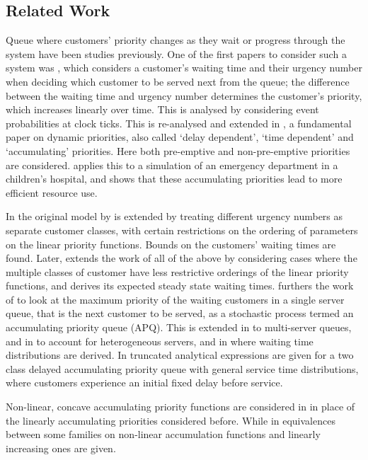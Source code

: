 \documentclass{article}
\begin{document}
\subsection{Related Work}\label{sec:related}
Queue where customers' priority changes as they wait or progress through the
system have been studies previously.
One of the first papers to consider such a system was \cite{jackson60}, which
considers a customer's waiting time and their urgency number when deciding which
customer to be served next from the queue; the difference between the waiting
time and urgency number determines the customer's priority, which increases
linearly over time.
This is analysed by considering event probabilities at clock ticks.
This is re-analysed and extended in \cite{kleinrock164}, a fundamental paper on
dynamic priorities, also called `delay dependent', `time dependent' and
`accumulating' priorities.
Here both pre-emptive and non-pre-emptive priorities are considered.
\cite{ferrandetal18} applies this to a simulation of an emergency department in
a children's hospital, and shows that these accumulating priorities lead to more
efficient resource use.

In \cite{holtzman71} the original model by \cite{jackson60} is extended by
treating different urgency numbers as separate customer classes, with certain
restrictions on the ordering of parameters on the linear priority functions.
Bounds on the customers' waiting times are found.
Later, \cite{bagchisullivan85} extends the work of all of the above by
considering cases where the multiple classes of customer have less restrictive
orderings of the linear priority functions, and \cite{sharma94} derives its
expected steady state waiting times.
\cite{stanford14} furthers the work of \cite{kleinrock164} to look at the
maximum priority of the waiting customers in a single server queue, that is
the next customer to be served, as a stochastic process termed an accumulating
priority queue (APQ).
This is extended in \cite{sharif14} to multi-server queues, and in \cite{li2016}
to account for heterogeneous servers, and in \cite{kella17} where waiting time
distributions are derived.
In \cite{bilodeau22} truncated analytical expressions are given for a two class
delayed accumulating priority queue with general service time distributions,
where customers experience an initial fixed delay before service.

Non-linear, concave accumulating priority functions are considered in
\cite{netterman79} in place of the linearly accumulating priorities considered
before.
While in \cite{li2017} equivalences between some families on non-linear
accumulation functions and linearly increasing ones are given.
\end{document}
